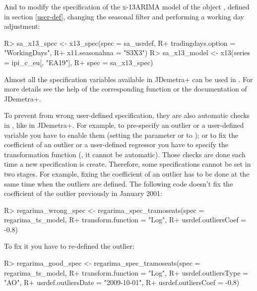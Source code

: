 \documentclass[article]{jss}
\begin{document}
And to modify the specification of the x-13ARIMA model of the object
, defined in section \ref{user-def}, changing the
seasonal filter and performing a working day adjustment:

\begin{CodeChunk}

\begin{CodeInput}
R> sa_x13_spec <- x13_spec(spec = sa_usrdef,
R+                          tradingdays.option = "WorkingDays",
R+                          x11.seasonalma = "S3X3")
R> sa_x13_model <- x13(series = ipi_c_eu[, "EA19"],
R+                     spec = sa_x13_spec)
\end{CodeInput}
\end{CodeChunk}

Almost all the specification variables available in JDemetra+ can be
used in . For more details see the help of the
corresponding function or the documentation of JDemetra+.

To prevent from wrong user-defined specification, they are also
automatic checks in , like in JDemetra+. For example, to
pre-specify an outlier or a user-defined variable you have to enable
them (setting the parameter  or
 to ); or to fix the coefficient of
an outlier or a user-defined regressor you have to specify the
transformation function (, it cannot be
automatic). Those checks are done each time a new specification is
create. Therefore, some specifications cannot be set in two stages. For
example, fixing the coefficient of an outlier has to be done at the same
time when the outliers are defined. The following code doesn't fix the
coefficient of the outlier previously in January 2001:

\begin{CodeChunk}

\begin{CodeInput}
R> regarima_wrong_spec <- regarima_spec_tramoseats(spec = regarima_ts_model,
R+              transform.function = "Log",
R+              usrdef.outliersCoef =  -0.8)
\end{CodeInput}
\end{CodeChunk}

To fix it you have to re-defined the outlier:

\begin{CodeChunk}

\begin{CodeInput}
R> regarima_good_spec <- regarima_spec_tramoseats(spec = regarima_ts_model,
R+              transform.function = "Log",
R+              usrdef.outliersType = "AO",
R+              usrdef.outliersDate = "2009-10-01",
R+              usrdef.outliersCoef =  -0.8)
\end{CodeInput}
\end{CodeChunk}
\end{document}
